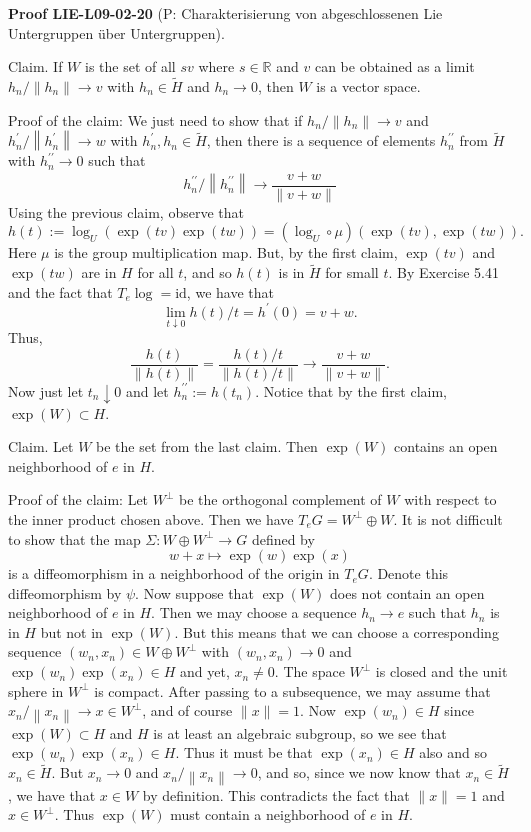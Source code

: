 \documentclass[10pt, letterpaper]{article}
\newcommand{\CustomHeading}[3]{%
  \par\medskip\noindent%
  \textbf{#1 #2} \textnormal{(#3)}.\enskip%
}
\newenvironment{PROOF}[2]{\CustomHeading{Proof}{#1}{#2}}{}
\begin{document}
\begin{PROOF}{LIE-L09-02-20}{P: Charakterisierung von abgeschlossenen Lie Untergruppen über Untergruppen}
Claim. If $W$ is the set of all $s v$ where $s \in \mathbb{R}$ and $v$ can be obtained as a limit $h_{n} /\left\|h_{n}\right\| \rightarrow v$ with $h_{n} \in \widetilde{H}$ and $h_{n} \rightarrow 0$, then $W$ is a vector space.

Proof of the claim: We just need to show that if $h_{n} /\left\|h_{n}\right\| \rightarrow v$ and $h_{n}^{\prime} /\left\|h_{n}^{\prime}\right\| \rightarrow w$ with $h_{n}^{\prime}, h_{n} \in \widetilde{H}$, then there is a sequence of elements $h_{n}^{\prime \prime}$ from $\widetilde{H}$ with $h_{n}^{\prime \prime} \rightarrow 0$ such that
$$
h_{n}^{\prime \prime} /\left\|h_{n}^{\prime \prime}\right\| \rightarrow \frac{v+w}{\|v+w\|}
$$
Using the previous claim, observe that
$$
h(t):=\log _{U}(\exp (t v) \exp (t w))=\left(\log _{U} \circ \mu\right)(\exp (t v), \exp (t w)) .
$$
Here $\mu$ is the group multiplication map. But, by the first claim, $\exp (t v)$ and $\exp (t w)$ are in $H$ for all $t$, and so $h(t)$ is in $\widetilde{H}$ for small $t$. By Exercise 5.41 and the fact that $T_{e} \log =\mathrm{id}$, we have that
$$
\lim _{t \downarrow 0} h(t) / t=h^{\prime}(0)=v+w .
$$
Thus,
$$
\frac{h(t)}{\|h(t)\|}=\frac{h(t) / t}{\|h(t) / t\|} \rightarrow \frac{v+w}{\|v+w\|} .
$$
Now just let $t_{n} \downarrow 0$ and let $h_{n}^{\prime \prime}:=h\left(t_{n}\right)$. Notice that by the first claim, $\exp (W) \subset H$.

Claim. Let $W$ be the set from the last claim. Then $\exp (W)$ contains an open neighborhood of $e$ in $H$.

Proof of the claim: Let $W^{\perp}$ be the orthogonal complement of $W$ with respect to the inner product chosen above. Then we have $T_{e} G=W^{\perp} \oplus W$. It is not difficult to show that the map $\Sigma: W \oplus W^{\perp} \rightarrow G$ defined by
$$
w+x \mapsto \exp (w) \exp (x)
$$
is a diffeomorphism in a neighborhood of the origin in $T_{e} G$. Denote this diffeomorphism by $\psi$. Now suppose that $\exp (W)$ does not contain an open neighborhood of $e$ in $H$. Then we may choose a sequence $h_{n} \rightarrow e$ such that $h_{n}$ is in $H$ but not in $\exp (W)$. But this means that we can choose a corresponding sequence $\left(w_{n}, x_{n}\right) \in W \oplus W^{\perp}$ with $\left(w_{n}, x_{n}\right) \rightarrow 0$ and $\exp \left(w_{n}\right) \exp \left(x_{n}\right) \in H$ and yet, $x_{n} \neq 0$. The space $W^{\perp}$ is closed and the unit sphere in $W^{\perp}$ is compact. After passing to a subsequence, we may assume that $x_{n} /\left\|x_{n}\right\| \rightarrow x \in W^{\perp}$, and of course $\|x\|=1$. Now $\exp \left(w_{n}\right) \in H$ since $\exp (W) \subset H$ and $H$ is at least an algebraic subgroup, so we see that $\exp \left(w_{n}\right) \exp \left(x_{n}\right) \in H$. Thus it must be that $\exp \left(x_{n}\right) \in H$ also and so $x_{n} \in \widetilde{H}$. But $x_{n} \rightarrow 0$ and $x_{n} /\left\|x_{n}\right\| \rightarrow 0$, and so, since we now know that $x_{n} \in \widetilde{H}$, we have that $x \in W$ by definition. This contradicts the fact that $\|x\|=1$ and $x \in W^{\perp}$. Thus $\exp (W)$ must contain a neighborhood of $e$ in $H$.


\end{PROOF}
\end{document}
